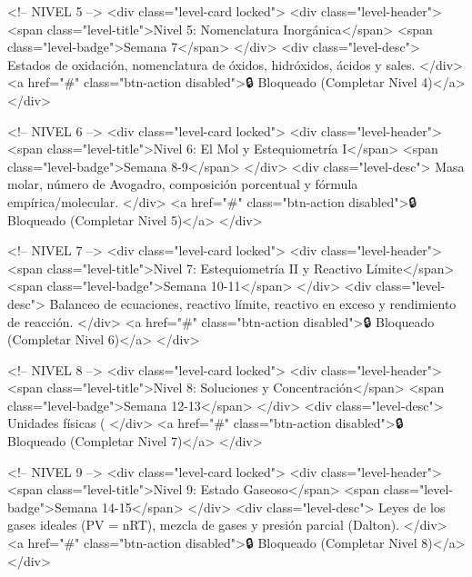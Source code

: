            <!-- NIVEL 5 -->
            <div class="level-card locked">
                <div class="level-header">
                    <span class="level-title">Nivel 5: Nomenclatura Inorgánica</span>
                    <span class="level-badge">Semana 7</span>
                </div>
                <div class="level-desc">
                    Estados de oxidación, nomenclatura de óxidos, hidróxidos, ácidos y sales.
                </div>
                <a href="#" class="btn-action disabled">🔒 Bloqueado (Completar Nivel 4)</a>
            </div>

            <!-- NIVEL 6 -->
            <div class="level-card locked">
                <div class="level-header">
                    <span class="level-title">Nivel 6: El Mol y Estequiometría I</span>
                    <span class="level-badge">Semana 8-9</span>
                </div>
                <div class="level-desc">
                    Masa molar, número de Avogadro, composición porcentual y fórmula empírica/molecular.
                </div>
                <a href="#" class="btn-action disabled">🔒 Bloqueado (Completar Nivel 5)</a>
            </div>

            <!-- NIVEL 7 -->
            <div class="level-card locked">
                <div class="level-header">
                    <span class="level-title">Nivel 7: Estequiometría II y Reactivo Límite</span>
                    <span class="level-badge">Semana 10-11</span>
                </div>
                <div class="level-desc">
                    Balanceo de ecuaciones, reactivo límite, reactivo en exceso y rendimiento de reacción.
                </div>
                <a href="#" class="btn-action disabled">🔒 Bloqueado (Completar Nivel 6)</a>
            </div>

            <!-- NIVEL 8 -->
            <div class="level-card locked">
                <div class="level-header">
                    <span class="level-title">Nivel 8: Soluciones y Concentración</span>
                    <span class="level-badge">Semana 12-13</span>
                </div>
                <div class="level-desc">
                    Unidades físicas (%
                </div>
                <a href="#" class="btn-action disabled">🔒 Bloqueado (Completar Nivel 7)</a>
            </div>

            <!-- NIVEL 9 -->
            <div class="level-card locked">
                <div class="level-header">
                    <span class="level-title">Nivel 9: Estado Gaseoso</span>
                    <span class="level-badge">Semana 14-15</span>
                </div>
                <div class="level-desc">
                    Leyes de los gases ideales (PV = nRT), mezcla de gases y presión parcial (Dalton).
                </div>
                <a href="#" class="btn-action disabled">🔒 Bloqueado (Completar Nivel 8)</a>
            </div>

